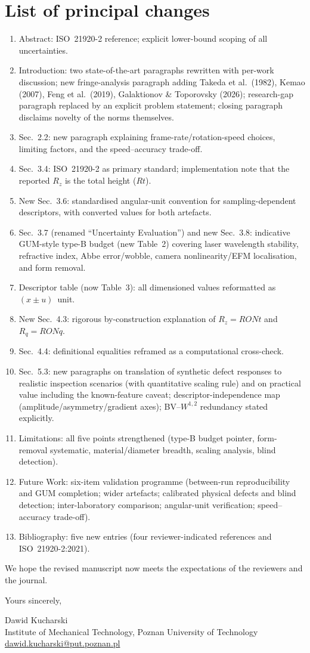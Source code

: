 \documentclass[11pt,a4paper]{article}
\begin{document}
\section*{List of principal changes}
\begin{enumerate}
\item Abstract: ISO~21920-2 reference; explicit lower-bound scoping of all uncertainties.
\item Introduction: two state-of-the-art paragraphs rewritten with per-work discussion; new fringe-analysis paragraph adding Takeda et al.\ (1982), Kemao (2007), Feng et al.\ (2019), Galaktionov \& Toporovsky (2026); research-gap paragraph replaced by an explicit problem statement; closing paragraph disclaims novelty of the norms themselves.
\item Sec.~2.2: new paragraph explaining frame-rate/rotation-speed choices, limiting factors, and the speed--accuracy trade-off.
\item Sec.~3.4: ISO~21920-2 as primary standard; implementation note that the reported $R_z$ is the total height ($Rt$).
\item New Sec.~3.6: standardised angular-unit convention for sampling-dependent descriptors, with converted values for both artefacts.
\item Sec.~3.7 (renamed ``Uncertainty Evaluation'') and new Sec.~3.8: indicative GUM-style type-B budget (new Table~2) covering laser wavelength stability, refractive index, Abbe error/wobble, camera nonlinearity/EFM localisation, and form removal.
\item Descriptor table (now Table~3): all dimensioned values reformatted as $(x \pm u)$~unit.
\item New Sec.~4.3: rigorous by-construction explanation of $R_z = RONt$ and $R_q = RONq$.
\item Sec.~4.4: definitional equalities reframed as a computational cross-check.
\item Sec.~5.3: new paragraphs on translation of synthetic defect responses to realistic inspection scenarios (with quantitative scaling rule) and on practical value including the known-feature caveat; descriptor-independence map (amplitude/asymmetry/gradient axes); BV--$W^{1,2}$ redundancy stated explicitly.
\item Limitations: all five points strengthened (type-B budget pointer, form-removal systematic, material/diameter breadth, scaling analysis, blind detection).
\item Future Work: six-item validation programme (between-run reproducibility and GUM completion; wider artefacts; calibrated physical defects and blind detection; inter-laboratory comparison; angular-unit verification; speed--accuracy trade-off).
\item Bibliography: five new entries (four reviewer-indicated references and ISO~21920-2:2021).
\end{enumerate}

We hope the revised manuscript now meets the expectations of the reviewers and the journal.

\bigskip
Yours sincerely,

Dawid Kucharski\\
Institute of Mechanical Technology, Poznan University of Technology\\
\href{mailto:dawid.kucharski@put.poznan.pl}{dawid.kucharski@put.poznan.pl}
\end{document}

